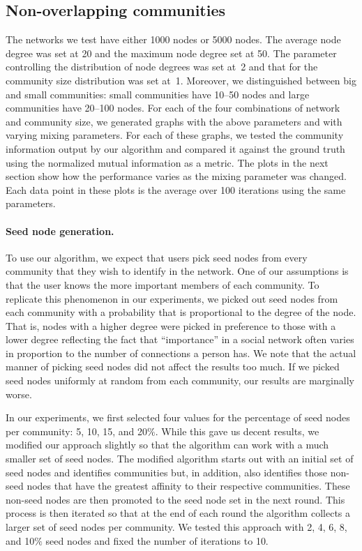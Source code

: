 \subsection{Non-overlapping communities}
The networks we test have either 1000 nodes or 5000 nodes. The average node degree
was set at 20 and the maximum node degree set at 50. The parameter controlling the 
distribution of node degrees was set at~2 and that for the community size distribution was 
set at~1. Moreover, we distinguished between big and small communities: small communities have 
10--50 nodes and large communities have 20--100 nodes. 
For each of the four combinations of network and community size, we generated graphs with the 
above parameters and with varying mixing parameters. For each of these graphs, we tested the 
community information output by our algorithm and compared it against the ground truth 
using the normalized mutual information as a metric. The plots in the next section 
show how the performance varies as the mixing parameter was changed. Each data point in 
these plots is the average over 100 iterations using the same parameters. 

\paragraph{Seed node generation.} 
To use our algorithm, we expect that users pick seed nodes from 
every community that they wish to identify in the network. One of our assumptions is that
the user knows the more important members of each community. To replicate 
this phenomenon in our experiments, we picked out seed nodes from each community 
with a probability that is proportional to the degree of the node. That is, nodes
with a higher degree were picked in preference to those with a lower degree reflecting the 
fact that ``importance'' in a social network often varies in proportion to the number of 
connections a person has. We note that the actual manner of picking seed nodes did not 
affect the results too much. If we picked seed nodes uniformly at random from each community, 
our results are marginally worse. 

In our experiments, we first selected four values for the percentage of seed nodes 
per community: 5, 10, 15, and 20$\%$. While this gave us decent results, we modified our 
approach slightly so that the algorithm can work with a much smaller set of seed nodes. 
The modified algorithm starts out with an initial set of seed nodes and identifies 
communities but, in addition, also identifies those non-seed nodes that have the 
greatest affinity to their respective communities. These non-seed nodes are then promoted 
to the seed node set in the next round. This process is then iterated so that at the end of each 
round the algorithm collects a larger set of seed nodes per community. We tested this approach with 
2, 4, 6, 8, and 10$\%$ seed nodes and fixed the number of iterations to 10. 

